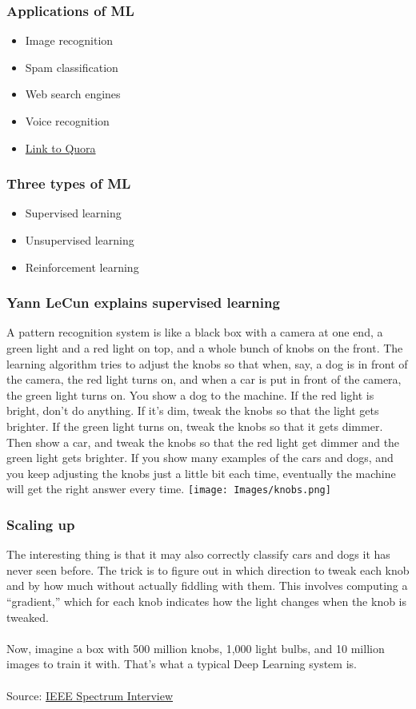 \documentclass{beamer}
\begin{document}
\begin{frame}
  \frametitle{Applications of ML}
  \begin{itemize}
  \item Image recognition
  \item Spam classification
  \item Web search engines
  \item Voice recognition
  \item \href{https://www.quora.com/What-are-some-real-world-examples-of-applications-of-machine-learning-in-the-field}{Link to Quora}
  \end{itemize}
\end{frame}

\begin{frame}
  \frametitle{Three types of ML}
  \begin{itemize}
  \item Supervised learning
  \item Unsupervised learning
  \item Reinforcement learning
  \end{itemize}
\end{frame}

\begin{frame}
  \frametitle{Yann LeCun explains supervised learning}
  \scriptsize
  A pattern recognition system is like a black box with a camera at one end, a green light and a red light on top, and a whole bunch of knobs on the front. The learning algorithm tries to adjust the knobs so that when, say, a dog is in front of the camera, the red light turns on, and when a car is put in front of the camera, the green light turns on. You show a dog to the machine. If the red light is bright, don't do anything. If it’s dim, tweak the knobs so that the light gets brighter. If the green light turns on, tweak the knobs so that it gets dimmer. Then show a car, and tweak the knobs so that the red light get dimmer and the green light gets brighter. If you show many examples of the cars and dogs, and you keep adjusting the knobs just a little bit each time, eventually the machine will get the right answer every time.
  \center
  \texttt{[image: Images/knobs.png]}
\end{frame}

\begin{frame}
  \frametitle{Scaling up}
  The interesting thing is that it may also correctly classify cars and dogs it has never seen before. The trick is to figure out in which direction to tweak each knob and by how much without actually fiddling with them. This involves computing a “gradient,” which for each knob indicates how the light changes when the knob is tweaked.
  \\~\\
  Now, imagine a box with 500 million knobs, 1,000 light bulbs, and 10 million images to train it with. That’s what a typical Deep Learning system is.
  \\~\\
  Source: \href{http://spectrum.ieee.org/automaton/robotics/artificial-intelligence/facebook-ai-director-yann-lecun-on-deep-learning}{IEEE Spectrum Interview}
\end{frame}
\end{document}
